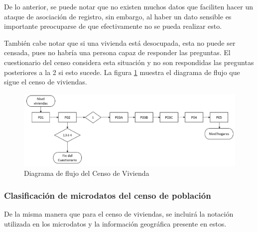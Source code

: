 \documentclass[informe]{upropuesta}
\begin{document}
De lo anterior, se puede notar que no existen muchos datos que faciliten hacer un ataque de asociación de registro, sin embargo, al haber un dato sensible es importante preocuparse de que efectivamente no se pueda realizar esto. 

También cabe notar que si una vivienda está desocupada, esta no puede ser censada, pues no habría una persona capaz de responder las preguntas. El cuestionario del censo considera esta situación y no son respondidas las preguntas posteriores a la 2 si esto sucede. La figura \ref{fig:flujoVivienda} muestra el diagrama de flujo que sigue el censo de viviendas.

\begin{figure}[H]
    \centering
    \includegraphics[width=\linewidth]{imagenes/investigacion/flujo_censo_viviendas.pdf}
    \caption{Diagrama de flujo del Censo de Vivienda~\cite{INE2017}}
    \label{fig:flujoVivienda}
\end{figure}

\subsubsection*{Clasificación de microdatos del censo de población}

De la misma manera que para el censo de viviendas, se incluirá la notación utilizada en los microdatos y la información geográfica presente en estos.
\end{document}
